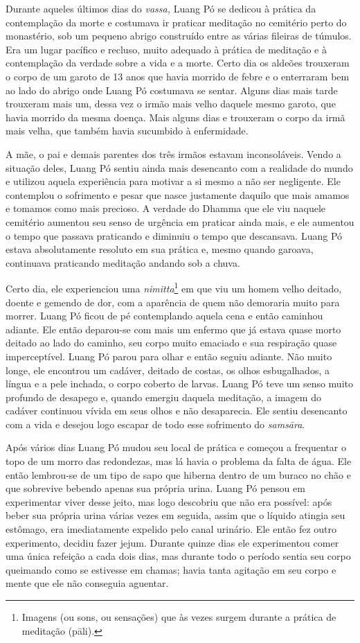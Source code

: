 Durante aqueles últimos dias do \emph{vassa,} Luang Pó se dedicou à
prática da contemplação da morte e costumava ir praticar meditação no
cemitério perto do monastério, sob um pequeno abrigo construído entre as
várias fileiras de túmulos. Era um lugar pacífico e recluso, muito
adequado à prática de meditação e à contemplação da verdade sobre a vida
e a morte. Certo dia os aldeões trouxeram o corpo de um garoto de 13
anos que havia morrido de febre e o enterraram bem ao lado do abrigo
onde Luang Pó costumava se sentar. Alguns dias mais tarde trouxeram mais
um, dessa vez o irmão mais velho daquele mesmo garoto, que havia morrido
da mesma doença. Mais alguns dias e trouxeram o corpo da irmã mais
velha, que também havia sucumbido à enfermidade.

A mãe, o pai e demais parentes dos três irmãos estavam inconsoláveis.
Vendo a situação deles, Luang Pó sentiu ainda mais desencanto com a
realidade do mundo e utilizou aquela experiência para motivar a si mesmo
a não ser negligente. Ele contemplou o sofrimento e pesar que nasce
justamente daquilo que mais amamos e tomamos como mais precioso. A
verdade do Dhamma que ele viu naquele cemitério aumentou seu senso de
urgência em praticar ainda mais, e ele aumentou o tempo que passava
praticando e diminuiu o tempo que descansava. Luang Pó estava
absolutamente resoluto em sua prática e, mesmo quando garoava,
continuava praticando meditação andando sob a chuva.

Certo dia, ele experienciou uma \emph{nimitta}\footnote{Imagens (ou
  sons, ou sensações) que às vezes surgem durante a prática de meditação
  (pāli).} em que viu um homem velho deitado, doente e gemendo de dor,
com a aparência de quem não demoraria muito para morrer. Luang Pó ficou
de pé contemplando aquela cena e então caminhou adiante. Ele então
deparou-se com mais um enfermo que já estava quase morto deitado ao lado
do caminho, seu corpo muito emaciado e sua respiração quase
imperceptível. Luang Pó parou para olhar e então seguiu adiante. Não
muito longe, ele encontrou um cadáver, deitado de costas, os olhos
esbugalhados, a língua e a pele inchada, o corpo coberto de larvas.
Luang Pó teve um senso muito profundo de desapego e, quando emergiu
daquela meditação, a imagem do cadáver continuou vívida em seus olhos e
não desaparecia. Ele sentiu desencanto com a vida e desejou logo escapar
de todo esse sofrimento do \emph{samsāra}.

Após vários dias Luang Pó mudou seu local de prática e começou a
frequentar o topo de um morro das redondezas, mas lá havia o problema da
falta de água. Ele então lembrou-se de um tipo de sapo que hiberna
dentro de um buraco no chão e que sobrevive bebendo apenas sua própria
urina. Luang Pó pensou em experimentar viver desse jeito, mas logo
descobriu que não era possível: após beber sua própria urina várias
vezes em seguida, assim que o líquido atingia seu estômago, era
imediatamente expelido pelo canal urinário. Ele então fez outro
experimento, decidiu fazer jejum. Durante quinze dias ele experimentou
comer uma única refeição a cada dois dias, mas durante todo o período
sentia seu corpo queimando como se estivesse em chamas; havia tanta
agitação em seu corpo e mente que ele não conseguia aguentar.

